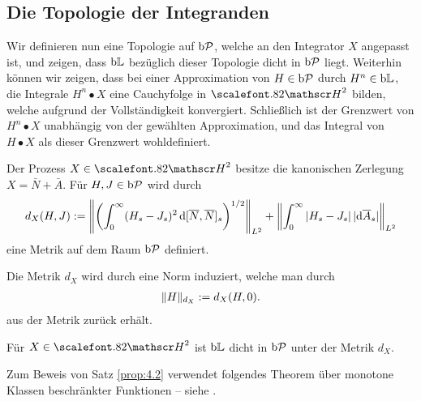 \subsection{Die Topologie der Integranden}

Wir definieren nun eine Topologie auf $\bPP$, welche an den Integrator $X$
angepasst ist, und zeigen, dass $\bL$ bezüglich dieser Topologie dicht in $\bPP$
liegt. Weiterhin können wir zeigen, dass bei einer Approximation von $H\in\bPP$
durch $H^n\in\bL$, die Integrale $H^n\bullet X$ eine Cauchyfolge in $\cH^2$
bilden, welche aufgrund der Vollständigkeit konvergiert. Schließlich ist der
Grenzwert von $H^n\bullet X$ unabhängig von der gewählten Approximation, und das
Integral von $H\bullet X$ als dieser Grenzwert wohldefiniert.

\begin{definition}
\label{defn:4.2}
Der Prozess $X\in\cH^2$ besitze die kanonischen Zerlegung $X=\bar{N} +
\bar{A}$. Für $H,J \in \bPP$ wird durch 
\begin{align*}
d_X(H,J) \defl
\norm*{\left( \int_0^\infty (H_s-J_s)^2\,\diffd[\bar{N},\bar{N}]_s
\right)^{1/2}}_{L^2} + \norm*{\int_0^\infty |H_s - J_s| \,
|\diffd\bar{A}_s|}_{L^2}
\end{align*}
eine Metrik auf dem Raum $\bPP$ definiert.\fish
\end{definition}

\begin{rem*}
Die Metrik $d_X$ wird durch eine Norm induziert, welche man durch
\begin{align*}
\norm{H}_{d_X}\defl d_X(H,0).
\end{align*}
aus der Metrik zurück erhält.\map
\end{rem*}
 
\begin{theorem}
\label{prop:4.2}
Für $X \in \cH^2$ ist $\bL$ dicht in $\bPP$ unter der Metrik $d_X$.\fish
\end{theorem}

Zum Beweis von Satz \ref{prop:4.2} verwendet folgendes Theorem über
monotone Klassen beschränkter Funktionen -- siehe
\cite{Protter:2004wfa,Dellacherie:1988tr}.

